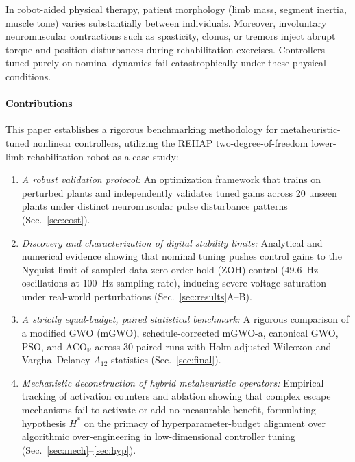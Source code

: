 \documentclass[a4paper,fleqn]{cas-dc}
\newcommand{\mgwo}{mGWO}
\newcommand{\mgwoa}{mGWO-a}
\newcommand{\acor}{ACO$_\mathbb{R}$}
\newcommand{\rehap}{REHAP}
\begin{document}
In robot-aided physical therapy, patient morphology (limb mass, segment inertia, muscle tone) varies substantially between individuals. Moreover, involuntary neuromuscular contractions such as spasticity, clonus, or tremors inject abrupt torque and position disturbances during rehabilitation exercises. Controllers tuned purely on nominal dynamics fail catastrophically under these physical conditions.

\paragraph{Contributions} This paper establishes a rigorous benchmarking methodology for metaheuristic-tuned nonlinear controllers, utilizing the \rehap{} two-degree-of-freedom lower-limb rehabilitation robot as a case study:
\begin{enumerate}
\item \emph{A robust validation protocol:} An optimization framework that trains on perturbed plants and independently validates tuned gains across 20 unseen plants under distinct neuromuscular pulse disturbance patterns (Sec.~\ref{sec:cost}).
\item \emph{Discovery and characterization of digital stability limits:} Analytical and numerical evidence showing that nominal tuning pushes control gains to the Nyquist limit of sampled-data zero-order-hold (ZOH) control ($49.6$~Hz oscillations at $100$~Hz sampling rate), inducing severe voltage saturation under real-world perturbations (Sec.~\ref{sec:results}A--B).
\item \emph{A strictly equal-budget, paired statistical benchmark:} A rigorous comparison of a modified GWO (\mgwo{}), schedule-corrected \mgwoa{}, canonical GWO, PSO, and \acor{} across 30 paired runs with Holm-adjusted Wilcoxon and Vargha--Delaney $A_{12}$ statistics (Sec.~\ref{sec:final}).
\item \emph{Mechanistic deconstruction of hybrid metaheuristic operators:} Empirical tracking of activation counters and ablation showing that complex escape mechanisms fail to activate or add no measurable benefit, formulating hypothesis $H^\ast$ on the primacy of hyperparameter-budget alignment over algorithmic over-engineering in low-dimensional controller tuning (Sec.~\ref{sec:mech}--\ref{sec:hyp}).
\end{enumerate}
\end{document}

